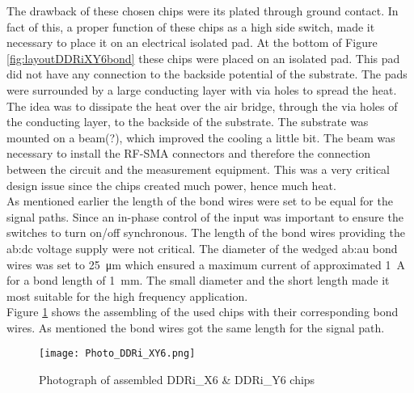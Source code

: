 The drawback of these chosen chips were its plated through ground contact. 
In fact of this, a proper function of these chips as a high side switch, made it necessary to place it on an electrical isolated pad.
At the bottom of Figure \ref{fig:layoutDDRiXY6bond} these chips were placed on an isolated pad.
This pad did not have any connection to the backside potential of the substrate.
The pads were surrounded by a large conducting layer with via holes to spread the heat.
The idea was to dissipate the heat over the air bridge, through the via holes of the conducting layer, to the backside of the substrate.
The substrate was mounted on a beam(?), which improved the cooling a little bit.
The beam was necessary to install the RF-SMA connectors and therefore the connection between the circuit and the measurement equipment.
This was a very critical design issue since the chips created much power, hence much heat.
\\
As mentioned earlier the length of the bond wires were set to be equal for the signal paths.
Since an in-phase control of the input was important to ensure the switches to turn on/off synchronous.
The length of the bond wires providing the \gls{ab:dc} voltage supply were not critical.
The diameter of the wedged \gls{ab:au} bond wires was set to \SI{25}{\micro \metre} which ensured a maximum current of approximated \SI{1}{\ampere} for a bond length of \SI{1}{\milli \metre}.
The small diameter and the short length made it most suitable for the high frequency application.\\
Figure \ref{fig:photoDDRiXY6bond} shows the assembling of the used chips with their corresponding bond wires.
As mentioned the bond wires got the same length for the signal path.


\begin{figure}[htb!] %
	\centering
  \texttt{[image: Photo\_DDRi\_XY6.png]}
	\caption{Photograph of assembled DDRi\_X6 \& DDRi\_Y6 chips}
	\label{fig:photoDDRiXY6bond}
\end{figure}


